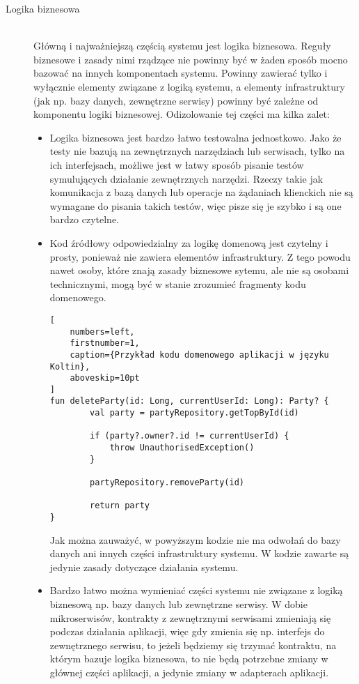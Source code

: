 \begin{description}
  \item[Logika biznesowa] \hfill \\ Główną i najważniejszą częścią systemu jest logika biznesowa. Reguły biznesowe i zasady nimi rządzące nie powinny być w żaden sposób mocno bazować na innych komponentach systemu. Powinny zawierać tylko i wyłącznie elementy związane z logiką systemu, a elementy infrastruktury (jak np. bazy danych, zewnętrzne serwisy) powinny być zależne od komponentu logiki biznesowej. Odizolowanie tej części ma kilka zalet:
\begin{itemize}
  \item Logika biznesowa jest bardzo łatwo testowalna jednostkowo. Jako że testy nie bazują na zewnętrznych narzędziach lub serwisach, tylko na ich interfejsach, możliwe jest w łatwy sposób pisanie testów symulujących działanie zewnętrznych narzędzi. Rzeczy takie jak komunikacja z bazą danych lub operacje na żądaniach klienckich nie są wymagane do pisania takich testów, więc pisze się je szybko i są one bardzo czytelne.
  \item Kod źródłowy odpowiedzialny za logikę domenową jest czytelny i prosty, ponieważ nie zawiera elementów infrastruktury. Z tego powodu nawet osoby, które znają zasady biznesowe sytemu, ale nie są osobami technicznymi, mogą być w stanie zrozumieć fragmenty kodu domenowego.
\begin{addmargin}[6mm]{0mm}
\begin{lstlisting}[
    numbers=left,
    firstnumber=1,
    caption={Przykład kodu domenowego aplikacji w języku Koltin},
    aboveskip=10pt
]
fun deleteParty(id: Long, currentUserId: Long): Party? {
        val party = partyRepository.getTopById(id)

        if (party?.owner?.id != currentUserId) {
            throw UnauthorisedException()
        }

        partyRepository.removeParty(id)

        return party
}
\end{lstlisting}
\end{addmargin}
  Jak można zauważyć, w powyższym kodzie nie ma odwołań do bazy danych ani innych części infrastruktury systemu. W kodzie zawarte są jedynie zasady dotyczące działania systemu.%
  \item Bardzo łatwo można wymieniać części systemu nie związane z logiką biznesową np. bazy danych lub zewnętrzne serwisy. W dobie mikroserwisów, kontrakty z zewnętrznymi serwisami zmieniają się podczas działania aplikacji, więc gdy zmienia się np. interfejs do zewnętrznego serwisu, to jeżeli będziemy się trzymać kontraktu, na którym bazuje logika biznesowa, to nie będą potrzebne zmiany w głównej części aplikacji, a jedynie zmiany w adapterach aplikacji.
\end{itemize}


\end{description}

